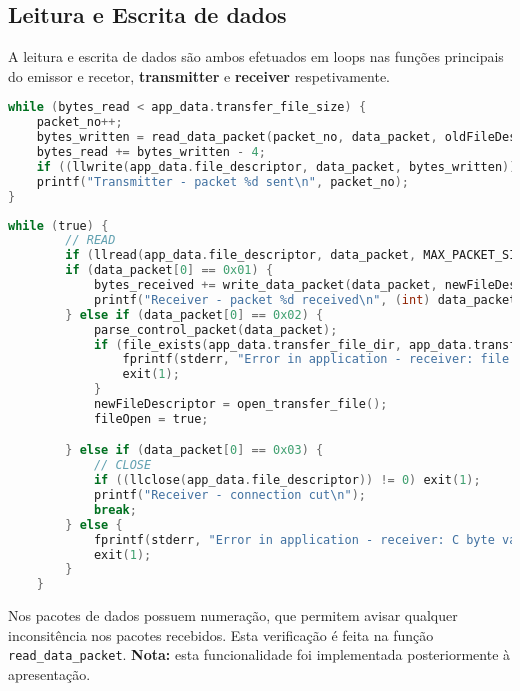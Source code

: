 \subsection{Leitura e Escrita de dados}

A leitura e escrita de dados são ambos efetuados em loops nas funções principais do emissor e recetor, \textbf{transmitter} e \textbf{receiver} respetivamente.

\begin{lstlisting}[language=C, caption=Envio de pacotes de dados]
while (bytes_read < app_data.transfer_file_size) {
    packet_no++;
    bytes_written = read_data_packet(packet_no, data_packet, oldFileDescriptor, bytes_read);
    bytes_read += bytes_written - 4;
    if ((llwrite(app_data.file_descriptor, data_packet, bytes_written)) == -1) exit(1);
    printf("Transmitter - packet %d sent\n", packet_no);
}
\end{lstlisting}


\begin{lstlisting}[language=C, caption=Leitura dos pacotes de dados]
    while (true) {
        // READ
        if (llread(app_data.file_descriptor, data_packet, MAX_PACKET_SIZE) == -1) exit(1);
        if (data_packet[0] == 0x01) {
            bytes_received += write_data_packet(data_packet, newFileDescriptor, &packet_no);
            printf("Receiver - packet %d received\n", (int) data_packet[1]);
        } else if (data_packet[0] == 0x02) {
            parse_control_packet(data_packet);
            if (file_exists(app_data.transfer_file_dir, app_data.transfer_file_name)) {
                fprintf(stderr, "Error in application - receiver: file already exists\n");
                exit(1);
            }
            newFileDescriptor = open_transfer_file();
            fileOpen = true;

        } else if (data_packet[0] == 0x03) {
            // CLOSE
            if ((llclose(app_data.file_descriptor)) != 0) exit(1);
            printf("Receiver - connection cut\n");
            break;
        } else {
            fprintf(stderr, "Error in application - receiver: C byte value invalid\n");
            exit(1);
        }
    }
\end{lstlisting}

Nos pacotes de dados possuem numeração, que permitem avisar qualquer inconsitência nos pacotes recebidos. Esta verificação é feita na função \texttt{read\_data\_packet}. \textbf{Nota:} esta funcionalidade foi implementada posteriormente à apresentação.
    
